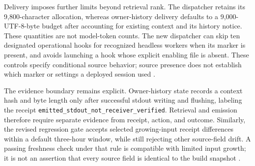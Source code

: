 Delivery imposes further limits beyond retrieval rank. The dispatcher retains its 9,800-character allocation, whereas owner-history delivery defaults to a 9,000-UTF-8-byte budget after accounting for existing context and its history notice. These quantities are not model-token counts. The new dispatcher can skip ten designated operational hooks for recognized headless workers when its marker is present, and avoids launching a hook whose explicit enabling file is absent. These controls specify conditional source behavior; source presence does not establish which marker or settings a deployed session used \citep{dispatcher20260923,ownerdelivery20260923}.

The evidence boundary remains explicit. Owner-history state records a context hash and byte length only after successful stdout writing and flushing, labeling the receipt \texttt{emitted\_stdout\_not\_receiver\_verified}. Retrieval and emission therefore require separate evidence from receipt, action, and outcome. Similarly, the revised regression gate accepts selected growing-input receipt differences within a default three-hour window, while still rejecting other source-field drift. A passing freshness check under that rule is compatible with limited input growth; it is not an assertion that every source field is identical to the build snapshot \citep{ownerdelivery20260923,braingate20260923}.
